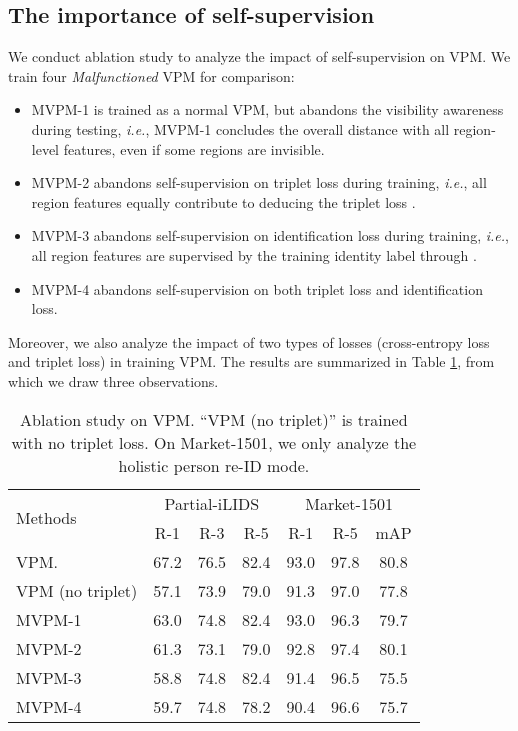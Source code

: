 \documentclass[10pt,twocolumn,letterpaper]{article}
\begin{document}
\subsection{The importance of self-supervision}\label{sec:importance}
We conduct ablation study to analyze the impact of self-supervision on VPM. 
We train four \emph{Malfunctioned} VPM for comparison:
\begin{itemize}
\item MVPM-1 is trained as a normal VPM, but abandons the visibility awareness during testing, \emph{i.e.}, MVPM-1 concludes the overall distance with all region-level features, even if some regions are invisible. 
\item MVPM-2 abandons self-supervision on triplet loss during training, \emph{i.e.}, all region features equally contribute to deducing the triplet loss . 
\item MVPM-3 abandons self-supervision on identification loss  during training, \emph{i.e.}, all region features are supervised by the training identity label through .
\item MVPM-4 abandons self-supervision on both triplet loss and identification loss.
\end{itemize}

Moreover, we also analyze the impact of  two types of losses (cross-entropy loss and triplet loss) in training VPM. The results are summarized in Table \ref{tab:ablation}, from which we draw three observations.

\setlength{\tabcolsep}{4.2pt}
\begin{table}[t]
\begin{center}
\begin{tabular}{l|ccc|ccc}
\hline
\multicolumn{1}{l|}{\multirow{2}{*}{Methods}}&\multicolumn{3}{c|}{Partial-iLIDS}&\multicolumn{3}{c}{Market-1501}\\
\cline{2-7}
\multicolumn{1}{c|}{}&R-1&R-3&R-5&R-1&R-5&mAP\\
\hline

VPM.             &67.2  & 76.5& 82.4 & 93.0&97.8&80.8\\
VPM (no triplet) & 57.1 &73.9 &79.0 &91.3&97.0&77.8\\
\hline
MVPM-1    &63.0&74.8&82.4        &   93.0 & 96.3&79.7\\  
MVPM-2     &61.3 &73.1 &79.0      &  92.8&97.4&80.1\\  
MVPM-3     &58.8 & 74.8 & 82.4    &   91.4&96.5&75.5\\
MVPM-4     &59.7 &74.8 & 78.2     &    90.4&96.6&75.7\\

\hline
\end{tabular}
\caption{Ablation study on VPM. ``VPM (no triplet)'' is trained with no triplet loss. On Market-1501, we only analyze the holistic person re-ID mode.}
\label{tab:ablation}
\end{center}
\setlength{\abovecaptionskip}{0cm} 
\setlength{\belowcaptionskip}{0pt} 
\end{table}
\end{document}

